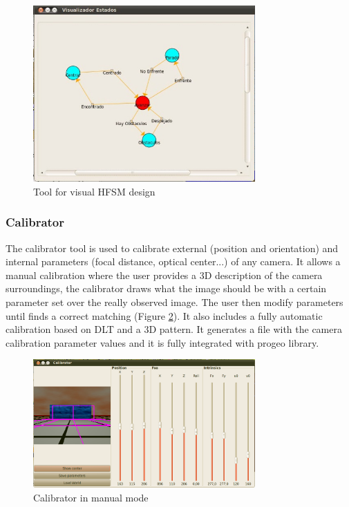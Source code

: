 \documentclass[twocolumn]{svjour3}          %
\begin{document}
\begin{figure}[h!]
  \includegraphics[width=8.5cm]{figs/ratonGatoAutoEjec.jpg}
\caption{Tool for visual HFSM design}
\label{fig:visualHFSM}
\end{figure}

\subsubsection{Calibrator}

The calibrator tool is used to calibrate external (position and orientation) and internal parameters (focal distance, optical center...) of any camera. It allows a manual calibration where the user provides a 3D description of the camera surroundings, the calibrator draws what the image should be with a certain parameter set over the really observed image. The user then modify parameters until finds a correct matching (Figure \ref{fig:calibrator}). It also includes a fully automatic calibration based on DLT and a 3D pattern. It generates a file with the camera calibration parameter values and it is fully integrated with progeo library.

\begin{figure}[h!]
  \includegraphics[width=8.5cm]{figs/calibratorGUI.png}
\caption{Calibrator in manual mode}
\label{fig:calibrator}
\end{figure}
\end{document}
